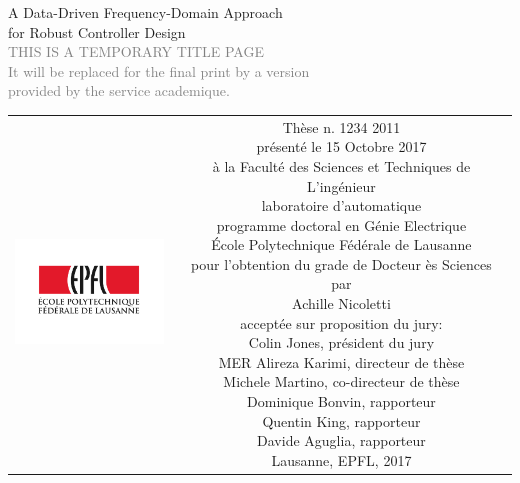 \begin{titlepage}
\begin{center}
\sffamily


\null\vspace{2cm}
{\huge A Data-Driven Frequency-Domain Approach\\[12pt] for Robust Controller Design} \\[24pt] 
\textcolor{gray}{\small{THIS IS A TEMPORARY TITLE PAGE \\ It will be replaced for the final print by a version \\ provided by the service academique.}}
    
\vfill

\begin{tabular} {cc}
\parbox{0.3\textwidth}{\includegraphics[width=4cm]{images/epfl}}
&
\parbox{0.7\textwidth}{%
	Thèse n. 1234 2011\\
	présenté le 15 Octobre 2017\\
	à la Faculté des Sciences et Techniques de L'ingénieur\\
	laboratoire d'automatique \\
	programme doctoral en Génie Electrique\\
%
	École Polytechnique Fédérale de Lausanne\\[6pt]
	pour l'obtention du grade de Docteur ès Sciences\\
	par\\ [4pt]
	\null \hspace{3em} Achille Nicoletti\\[9pt]
%
\small
acceptée sur proposition du jury:\\[4pt]
%
    Colin Jones, président du jury\\
    MER Alireza Karimi, directeur de thèse\\
    Michele Martino, co-directeur de thèse\\
    Dominique Bonvin, rapporteur\\
    Quentin King, rapporteur\\
    Davide Aguglia, rapporteur\\[12pt]
%
Lausanne, EPFL, 2017}
\end{tabular}
\end{center}
\vspace{2cm}
\end{titlepage}



